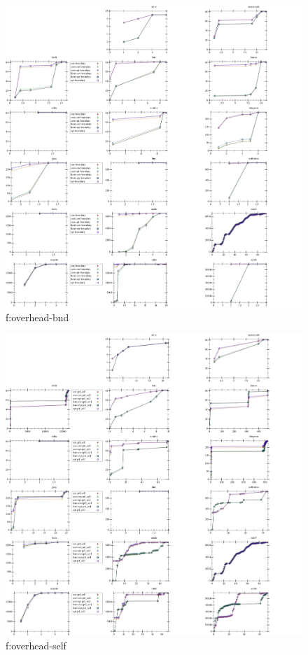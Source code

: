 \begin{figure}[t]
  \includegraphics[width=\textwidth]{data/cdf-overhead_boundary.pdf}
  \caption{f:overhead-bnd}
  \label{f:overhead-bnd}
\end{figure}

\begin{figure}[t]
  \includegraphics[width=\textwidth]{data/cdf-overhead_prf_self.pdf}
  \caption{f:overhead-self}
  \label{f:overhead-self}
\end{figure}

